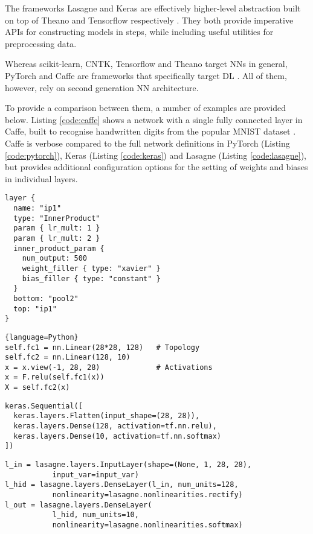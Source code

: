 \documentclass[report.tex]{subfiles}
\begin{document}
The frameworks Lasagne and Keras are effectively higher-level abstraction
built on top of Theano and Tensorflow respectively \cite{Lasagne2018, Keras2018}.
They both provide imperative \gls{API}s for constructing models in steps, while
including useful utilities for preprocessing data.

Whereas scikit-learn, CNTK, Tensorflow and Theano target \glspl{NN} in general,
PyTorch and Caffe are frameworks that specifically target \gls{DL} 
\cite{PyTorch2018, Caffe2018}.
All of them, however, rely on second generation \gls{NN} architecture.

To provide a comparison between them, a number of examples are provided below.
Listing \ref{code:caffe} shows a network with a single fully connected
layer in Caffe, built to recognise handwritten digits from the 
popular MNIST dataset \cite{LeCun1998}.
Caffe is verbose compared to the full network definitions in PyTorch 
(Listing \ref{code:pytorch}), Keras (Listing \ref{code:keras}) and
Lasagne (Listing \ref{code:lasagne}), but provides additional 
configuration options for the setting of weights and biases in 
individual layers.

\begin{lstlisting}
layer {
  name: "ip1"
  type: "InnerProduct"
  param { lr_mult: 1 }
  param { lr_mult: 2 }
  inner_product_param {
    num_output: 500
    weight_filler { type: "xavier" }
    bias_filler { type: "constant" }
  }
  bottom: "pool2"
  top: "ip1"
}
\end{lstlisting} \label{code:caffe}

\begin{lstlisting}{language=Python}
self.fc1 = nn.Linear(28*28, 128)   # Topology
self.fc2 = nn.Linear(128, 10)
x = x.view(-1, 28, 28)             # Activations
x = F.relu(self.fc1(x))
X = self.fc2(x)
\end{lstlisting} \label{code:pytorch}

\begin{lstlisting}
keras.Sequential([
  keras.layers.Flatten(input_shape=(28, 28)),
  keras.layers.Dense(128, activation=tf.nn.relu),
  keras.layers.Dense(10, activation=tf.nn.softmax)
])
\end{lstlisting} \label{code:keras}

\begin{lstlisting}
l_in = lasagne.layers.InputLayer(shape=(None, 1, 28, 28),
           input_var=input_var)
l_hid = lasagne.layers.DenseLayer(l_in, num_units=128,
           nonlinearity=lasagne.nonlinearities.rectify)
l_out = lasagne.layers.DenseLayer(
           l_hid, num_units=10,
           nonlinearity=lasagne.nonlinearities.softmax)
\end{lstlisting} \label{code:lasagne}
\end{document}
